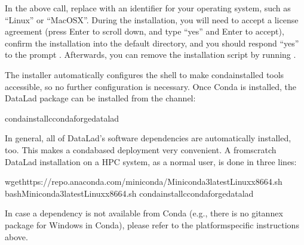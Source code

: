 \sphinxAtStartPar
In the above call, replace  with an identifier for your operating
system, such as “Linux” or “MacOSX”.  During the installation, you will need to
accept a license agreement (press Enter to scroll down, and type “yes” and
Enter to accept), confirm the installation into the default directory, and you
should respond “yes” to the prompt .  Afterwards, you can remove the
installation script by running .

\sphinxAtStartPar
The installer automatically configures the shell to make conda\sphinxhyphen{}installed tools
accessible, so no further configuration is necessary.  Once Conda is installed,
the DataLad package can be installed from the  channel:

\begin{sphinxVerbatim}[commandchars=\\\{\}]
condainstall\PYGZhy{}cconda\PYGZhy{}forgedatalad
\end{sphinxVerbatim}

\sphinxAtStartPar
In general, all of DataLad’s software dependencies are automatically installed, too.
This makes a conda\sphinxhyphen{}based deployment very convenient. A from\sphinxhyphen{}scratch DataLad installation
on a HPC system, as a normal user, is done in three lines:

\begin{sphinxVerbatim}[commandchars=\\\{\}]
wgethttps://repo.anaconda.com/miniconda/Miniconda3\PYGZhy{}latest\PYGZhy{}Linux\PYGZhy{}x86\PYGZus{}64.sh
bashMiniconda3\PYGZhy{}latest\PYGZhy{}Linux\PYGZhy{}x86\PYGZus{}64.sh
condainstall\PYGZhy{}cconda\PYGZhy{}forgedatalad
\end{sphinxVerbatim}

\sphinxAtStartPar
In case a dependency is not available from Conda (e.g., there is no git\sphinxhyphen{}annex
package for Windows in Conda), please refer to the platform\sphinxhyphen{}specific
instructions above.

